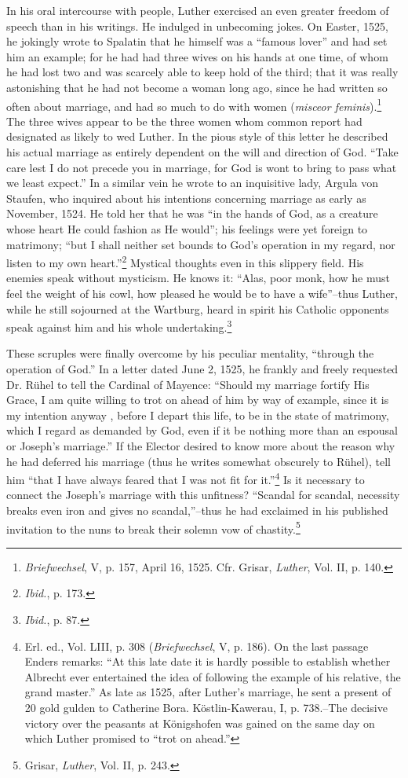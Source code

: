 In his oral intercourse with people, Luther exercised an even greater
freedom of speech than in his writings. He indulged in unbecoming
jokes. On Easter, 1525, he jokingly wrote to Spalatin that he himself
was a “famous lover” and had set him an example; for he had had
three wives on his hands at one time, of whom he had lost two and
was scarcely able to keep hold of the third; that it was really astonishing
that he had not become a woman long ago, since he had written
so often about marriage, and had so much to do with women (\textit{misceor
feminis}).\footnote
{\textit{Briefwechsel}, V, p. 157, April 16, 1525. Cfr. Grisar, \textit{Luther}, Vol. II, p. 140.}
The three wives appear to be the three women whom
common report had designated as likely to wed Luther.
In the pious style of this letter he described his actual marriage as
entirely dependent on the will and direction of God. “Take care lest
I do not precede you in marriage, for God is wont to bring to pass
what we least expect.” In a similar vein he wrote to an inquisitive
lady, Argula von Staufen, who inquired about his intentions concerning
marriage as early as November, 1524. He told her that he was
“in the hands of God, as a creature whose heart He could fashion as
He would”; his feelings were yet foreign to matrimony; “but I shall
neither set bounds to God’s operation in my regard, nor listen to my
own heart.”\footnote{\textit{Ibid.}, p. 173.}
Mystical thoughts even in this slippery field. His enemies
speak without mysticism. He knows it: “Alas, poor monk, how
he must feel the weight of his cowl, how pleased he would be to have
a wife”--thus Luther, while he still sojourned at the Wartburg, heard
in spirit his Catholic opponents speak against him and his whole undertaking.\footnote
{\textit{Ibid.}, p. 87.}

These scruples were finally overcome by his peculiar mentality,
“through the operation of God.” In a letter dated June 2, 1525, he
frankly and freely requested Dr. Rühel to tell the Cardinal of Mayence:
“Should my marriage fortify His Grace, I am quite willing to
trot on ahead of him by way of example, since it is my intention anyway
, before I depart this life, to be in the state of matrimony, which
I regard as demanded by God, even if it be nothing more than an
espousal or Joseph’s marriage.” If the Elector desired to know more
about the reason why he had deferred his marriage (thus he writes
somewhat obscurely to Rühel), tell him “that I have always feared
that I was not fit for it.”\footnote
{Erl. ed., Vol. LIII, p. 308 (\textit{Briefwechsel}, V, p. 186). On the last passage Enders remarks:
``At this late date it is hardly possible to establish whether Albrecht ever entertained
the idea of following the example of his relative, the grand master.'' As late as
1525, after Luther's marriage, he sent a present of 20 gold gulden to Catherine Bora.
Köstlin-Kawerau, I, p. 738.--The decisive victory over the peasants at Königshofen was
gained on the same day on which Luther promised to ``trot on ahead.''}
Is it necessary to connect the Joseph’s
marriage with this unfitness? “Scandal for scandal, necessity breaks
even iron and gives no scandal,”--thus he had exclaimed in his published
invitation to the nuns to break their solemn vow of chastity.\footnote
{Grisar, \textit{Luther}, Vol. II, p. 243. }

